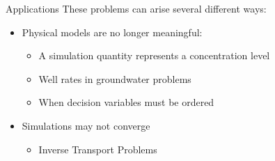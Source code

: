 \documentclass{beamer}
\begin{document}
\begin{frame}{Applications}
	These problems can arise several different ways:
	\begin{itemize}
		\setlength\itemsep{1.5em}
		\item Physical models are no longer meaningful:
		\begin{itemize}
			\item A simulation quantity represents a concentration level
			\item Well rates in groundwater problems
			\item When decision variables must be ordered
		\end{itemize}
		\item Simulations may not converge
		\begin{itemize}
			\item Inverse Transport Problems \cite{Armstrong}
		\end{itemize}
	\end{itemize}
% 
% 
% 
% 
% 
% 
% 

\end{frame}
\end{document}
